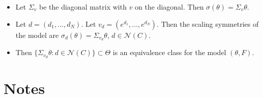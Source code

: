 \documentclass{article}
\begin{document}
\begin{itemize}

\item
Let $\Sigma_v$ be the diagonal matrix with $v$ on the diagonal. Then $\sigma(\theta)=\Sigma_v\theta$.

\item
Let $d=(d_1,...,d_N)$. Let $v_d = (e^{d_1},...,e^{d_N})$. Then the scaling symmetries of the model are $\sigma_{d}(\theta)=\Sigma_{v_d}\theta$, $d\in\mathcal{N}(C)$.

\item
Then $\{\Sigma_{v_d}\theta:d\in\mathcal{N}(C)\}\subset\Theta$ is an equivalence class for the model $(\theta,F)$.

\end{itemize}


\section{Notes}
\end{document}
